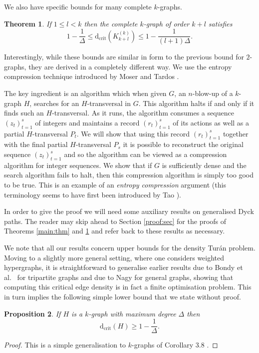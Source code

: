 \documentclass[12]{article}
\def\tr{\textrm}
\def\dcrit{\tr{d}_{\tr{crit}}}
\newtheorem{thm}{Theorem}
\newtheorem{prop}[thm]{Proposition}
\begin{document}
We also have specific bounds for many complete $k$-graphs.
\begin{thm}\label{complete:thm}
  If $1\leq l<k$ then the complete $k$-graph of order $k+l$ satisfies
  \[
1-\frac{1}{\Delta}\leq  \dcrit(K_{k+l}^{(k)})\leq 1-\frac{1}{(l+1)\Delta}.\]
\end{thm} 
 
Interestingly, while these bounds are similar in form to the
previous bound for $2$-graphs, they are derived in a completely different
way. We use the entropy compression technique introduced by Moser and Tardos \cite{Moser}. 

The key ingredient is an algorithm which when given $G$, an $n$-blow-up of a $k$-graph $H$, searches for an $H$-transversal in $G$. This algorithm halts if and only if it finds such an $H$-transversal. As it runs, the algorithm consumes a sequence $(z_t)_{t=1}^s$ of integers and
maintains a record $(r_t)_{t=1}^s$ of its actions as well as a partial $H$-transversal $P_t$. We will show that using this record $(r_t)_{t=1}^s$ together with the final partial $H$-transversal $P_s$  it is possible to reconstruct the original sequence $(z_t)_{t=1}^s$ and so the algorithm can be viewed as a compression algorithm for integer sequences. We show that if $G$ is sufficiently dense and the search algorithm fails to halt, then this compression algorithm is simply too good to be true. This is an example of an \emph{entropy compression} argument (this terminology seems to have first been introduced by Tao \cite{Tao}).

In order to give the proof we will need some auxiliary results on generalised Dyck paths. The reader may skip ahead to Section \ref{proof:sec} for the proofs of Theorems \ref{main:thm} and \ref{complete:thm} and refer back to these results as necessary. 

We note that all our results concern upper bounds for the density Tur\'an problem.   Moving to a slightly more general setting, where one considers weighted hypergraphs, it is straightforward to generalise earlier results due to Bondy et al.~\cite{BSTT} for tripartite graphs  and due to Nagy \cite{nagy} for general graphs, showing that computing this critical edge density is in fact a finite optimisation problem. This in turn implies the following simple lower bound that we state without proof.
\begin{prop}\label{finite:prop} 
  If $H$ is a $k$-graph with maximum degree $\Delta$ then \[
  \dcrit(H)\geq 1-\frac{1}{\Delta}.\]
\end{prop}
\begin{proof}
  This is a simple generalisation to $k$-graphs of Corollary 3.8 \cite{nagy}.
\end{proof}
 
\end{document}
